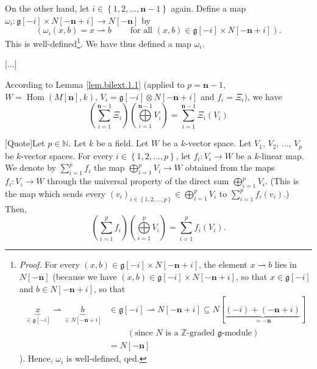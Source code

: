 \documentclass[etingof-lie.tex]{subfiles}
\begin{document}
\begin{noncompile}
On the other hand, let $i\in\left\{  1,2,...,\mathbf{n}-1\right\}  $ again.
Define a map $\omega_{i}:\mathfrak{g}\left[  -i\right]  \times N\left[
-\mathbf{n}+i\right]  \rightarrow N\left[  -\mathbf{n}\right]  $ by%
\begin{equation}
\left(  \omega_{i}\left(  x,b\right)  =x\rightharpoonup
b\ \ \ \ \ \ \ \ \ \ \text{for all }\left(  x,b\right)  \in\mathfrak{g}\left[
-i\right]  \times N\left[  -\mathbf{n}+i\right]  \right)  .
\label{pf.bilext.1.omega_i}%
\end{equation}
This is well-defined\footnote{\textit{Proof.} For every $\left(  x,b\right)
\in\mathfrak{g}\left[  -i\right]  \times N\left[  -\mathbf{n}+i\right]  $, the
element $x\rightharpoonup b$ lies in $N\left[  -\mathbf{n}\right]  $ (because
we have $\left(  x,b\right)  \in\mathfrak{g}\left[  -i\right]  \times N\left[
-\mathbf{n}+i\right]  $, so that $x\in\mathfrak{g}\left[  -i\right]  $ and
$b\in N\left[  -\mathbf{n}+i\right]  $, so that
\begin{align*}
\underbrace{x}_{\in\mathfrak{g}\left[  -i\right]  }\rightharpoonup
\underbrace{b}_{\in N\left[  -\mathbf{n}+i\right]  }  &  \in\mathfrak{g}%
\left[  -i\right]  \rightharpoonup N\left[  -\mathbf{n}+i\right]  \subseteq
N\left[  \underbrace{\left(  -i\right)  +\left(  -\mathbf{n}+i\right)
}_{=-\mathbf{n}}\right] \\
&  \ \ \ \ \ \ \ \ \ \ \left(  \text{since }N\text{ is a }\mathbb{Z}%
\text{-graded }\mathfrak{g}\text{-module}\right) \\
&  =N\left[  -\mathbf{n}\right]
\end{align*}
). Hence, $\omega_{i}$ is well-defined, qed.}. We have thus defined a map
$\omega_{i}$.

[...]

According to Lemma \ref{lem.bilext.1.1} (applied to $p=\mathbf{n}-1$,
$W=\operatorname*{Hom}\left(  M\left[  \mathbf{n}\right]  ,k\right)  $,
$V_{i}=\mathfrak{g}\left[  -i\right]  \otimes N\left[  -\mathbf{n}+i\right]  $
and $f_{i}=\Xi_{i}$), we have%
\[
\left(  \sum\limits_{i=1}^{\mathbf{n}-1}\Xi_{i}\right)  \left(  \bigoplus
\limits_{i=1}^{\mathbf{n}-1}V_{i}\right)  =\sum\limits_{i=1}^{\mathbf{n}-1}%
\Xi_{i}\left(  V_{i}\right)
\]


[Quote]Let $p\in\mathbb{N}$. Let $k$ be a field. Let $W$ be a $k$-vector
space. Let $V_{1}$, $V_{2}$, $...$, $V_{p}$ be $k$-vector spaces. For every
$i\in\left\{  1,2,...,p\right\}  $, let $f_{i}:V_{i}\rightarrow W$ be a
$k$-linear map. We denote by $\sum\limits_{i=1}^{p}f_{i}$ the map
$\bigoplus\limits_{i=1}^{p}V_{i}\rightarrow W$ obtained from the maps
$f_{i}:V_{i}\rightarrow W$ through the universal property of the direct sum
$\bigoplus\limits_{i=1}^{p}V_{i}$. (This is the map which sends every $\left(
v_{i}\right)  _{i\in\left\{  1,2,...,p\right\}  }\in\bigoplus\limits_{i=1}%
^{p}V_{i}$ to $\sum\limits_{i=1}^{p}f_{i}\left(  v_{i}\right)  $.) Then,%
\[
\left(  \sum\limits_{i=1}^{p}f_{i}\right)  \left(  \bigoplus\limits_{i=1}%
^{p}V_{i}\right)  =\sum\limits_{i=1}^{p}f_{i}\left(  V_{i}\right)  .
\]



\end{noncompile}
\end{document}
